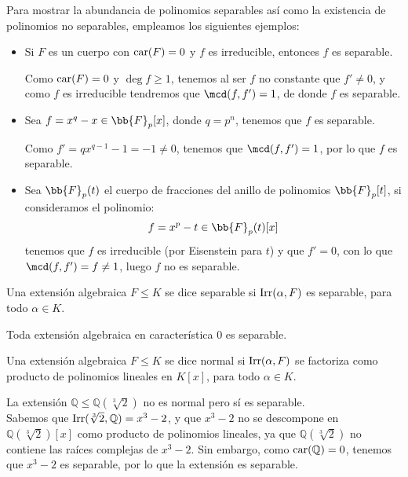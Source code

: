 \begin{ejemplo}
    Para mostrar la abundancia de polinomios separables así como la existencia de polinomios no separables, empleamos los siguientes ejemplos:
    \begin{itemize}
        \item Si $F$ es un cuerpo con $\operatorname{car}(F)= 0$ y $f$ es irreducible, entonces $f$ es separable.

            Como $\operatorname{car}(F)=0$ y $\deg f\geq 1$, tenemos al ser $f$ no constante que $f'\neq 0$, y como $f$ es irreducible tendremos que $\mcd(f,f')=1$, de donde $f$ es separable.
        \item Sea $f=x^q-x\in \bb{F}_p[x]$, donde $q=p^n$, tenemos que $f$ es separable.

            Como $f'=qx^{q-1}-1 = -1\neq 0$, tenemos que $\mcd(f,f')=1$, por lo que $f$ es separable.
        \item Sea $\bb{F}_p(t)$ el cuerpo de fracciones del anillo de polinomios $\bb{F}_p[t]$, si consideramos el polinomio:
            \begin{equation*}
                f = x^p-t\in \bb{F}_p(t)[x]
            \end{equation*}
            tenemos que $f$ es irreducible (por Eisenstein para $t$) y que $f'=0$, con lo que $\mcd(f,f')=f\neq 1$, luego $f$ no es separable.
    \end{itemize}
\end{ejemplo}

\begin{definicion}
    Una extensión algebraica $F\leq K$ se dice separable si $\operatorname{Irr}(\alpha,F)$ es separable, para todo $\alpha\in K$.
\end{definicion}

\begin{observacion}
    Toda extensión algebraica en característica $0$ es separable.
\end{observacion}

\begin{definicion}
    Una extensión algebraica $F\leq K$ se dice normal si $\operatorname{Irr}(\alpha,F)$ se factoriza como producto de polinomios lineales en $K[x]$, para todo $\alpha\in K$.
\end{definicion}

\begin{ejemplo}\label{ejemplo:extension_no_normal}
    La extensión $\mathbb{Q}\leq \mathbb{Q}(\sqrt[3]{2})$ no es normal pero sí es separable.\\

    Sabemos que $\operatorname{Irr}(\sqrt[3]{2},\mathbb{Q}) = x^3-2$, y que $x^3-2$ no se descompone en $\mathbb{Q}(\sqrt[3]{2})[x]$ como producto de polinomios lineales, ya que $\mathbb{Q}(\sqrt[3]{2})$ no contiene las raíces complejas de $x^3-2$. Sin embargo, como $\operatorname{car}(\mathbb{Q})=0$, tenemos que $x^3-2$ es separable, por lo que la extensión es separable.
\end{ejemplo}

